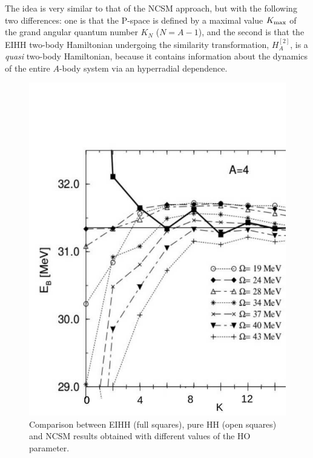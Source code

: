 The idea is very similar to that of the NCSM approach, but with the following two differences:
one is that the P-space is defined by a maximal value $K_{\rm max}$ of the 
grand angular quantum number $K_N$ ($N=A-1$), and the second is that 
the EIHH two-body Hamiltonian  undergoing the similarity transformation, $H_A^{[2]}$, is a {\it quasi} 
two-body Hamiltonian, because it  contains information about the dynamics of the entire $A$-body system via an hyperradial dependence. 
\begin{figure}
\sidecaption
\includegraphics[scale=.35]{Chapter7-figures/fig2.pdf}
%
%
\caption{Comparison between EIHH (full squares), pure HH 
(open squares)  and NCSM results obtained with different values of the HO
parameter.}
\label{fig:2}       %
\end{figure}

